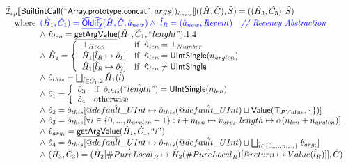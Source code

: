 \documentclass{article}
\makeatletter
\newcommand{\SF}[1]{\mbox{\textsf{#1}}}
\newcommand{\comment}[1]{\textit{#1}}
\newcommand{\wherec}[1]{{\rm where}\begin{array}[t]{l}#1\end{array}}
\newcommand{\ifc}[1]{{\rm if}\begin{array}[t]{l}#1\end{array}}
\newcommand{\owc}{{\rm otherwise}}
\newcommand{\Value}{\SF{Value}}
\newcommand{\aI}{\hat{\mathcal{I}}}
\newcommand{\set}[1]{\left\{\begin{array}{l}#1\end{array}\right\}}
\newcommand{\lbr}{\llbracket}
\newcommand{\rbr}{\rrbracket}
\newcommand{\hf}[1]{\underline{\sf #1}}
\newcommand{\ahf}[1]{\widehat{\underline{\sf #1}}}
\newcommand{\varprop}[1]{@#1}
\newcommand{\avarloc}[1]{\hat{\##1}}
\newcommand{\avarprop}[1]{\hat{@#1}}
\def\inblue{\color{blue}}
\def\inblue{\color{blue}}
\makeatother
\begin{document}
\[\begin{array}{l}
\aI _{cp}\lbr \SF{BuiltintCall}(``\SF{Array.prototype.concat}",args))_{\hat{a}_{new}}\rbr((\hat{H},\hat{C}), \hat{S})
  = ((\hat{H}_3, \hat{C_3}), \hat{S})\\
\quad\wherec{
  \inblue (\hat{H}_1, \hat{C}_1) = \ahf{Oldify}(\hat{H}, \hat{C}, \hat{a}_{new})
  \land\ \inblue\hat{l}_{R} = (\hat{a}_{new}, Recent)
    \quad\comment{{\inblue // Recency Abstraction}}\\
  \land\ \hat{n}_{len} = \hf{getArgValue}(\hat{H}_1, \hat{C}_1, ``lenght").1.4\\
  \land\ \hat{H}_2 = \left\{\begin{array}{ll}
      \bot_{Heap} & \ifc{\hat{n}_{len} = \bot_{Number}}\\
      \hat{H}_1[\hat{l}_R \mapsto \hat{o}_1] & \ifc{\hat{n}_{len} = \SF{UIntSingle}(n_{arglen})}\\
      \hat{H}_1[\hat{l}_R \mapsto \hat{o}_2] & \ifc{\hat{n}_{len} \neq \SF{UIntSingle}}
    \end{array}\right.\\
  \land\ \hat{o}_{this} = \bigsqcup_{\hat{l} \in \hat{C}_1.2} \hat{H}_1(\hat{l})\\
  \land\ \hat{o}_1 = \left\{\begin{array}{ll}
      \hat{o}_3 & \ifc{\hat{o}_{this}(\hat{``length"}) = \SF{UIntSingle}(n_{len})}\\
      \hat{o}_4 & \owc
    \end{array}\right.\\
  \land\ \hat{o}_2 = \hat{o}_{this}[\avarprop{default\_UInt}
    \mapsto \hat{o}_{this}(\avarprop{default\_UInt}) \sqcup \Value(\top_{PValue}, \set{})]\\
  \land\ \hat{o}_3 = \hat{o}_{this}[\forall i \in \{0, ..., n_{arglen}-1\}: i + n_{len}
    \mapsto \hat{v}_{arg_i}, length \mapsto \alpha(n_{len} + n_{arglen})]\\
  \land\ \hat{v}_{arg_i} = \hf{getArgValue}(\hat{H}_1, \hat{C}_1, ``i")\\
  \land\ \hat{o}_4 = \hat{o}_{this}[\avarprop{default\_UInt}
    \mapsto \hat{o}_{this}(\avarprop{default\_UInt}) 
    \sqcup \bigsqcup_{\hat{i} \in \{0, ..., n_{len}\}} \hat{v}_{arg_i}]\\
  \land\ (\hat{H}_3, \hat{C}_3) = 
      (\hat{H}_2[\avarloc{PureLocal}_R \mapsto \hat{H}_2(\avarloc{PureLocal}_R)[\varprop{return} \mapsto Value(\hat{l}_R)]], \hat{C})\\
  }\\
\\\\




\end{array}\]
\end{document}

